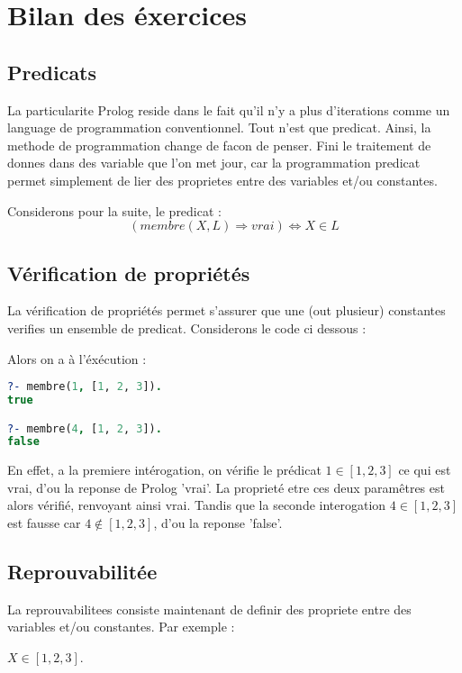 
\chapter{Bilan des éxercices}

\section{Predicats}

La particularite Prolog reside dans le fait qu'il n'y a plus d'iterations comme
un language de programmation conventionnel. Tout n'est que predicat. Ainsi, la
methode de programmation change de facon de penser. Fini le traitement de donnes
dans des variable que l'on met jour, car la programmation predicat permet
simplement de lier des proprietes entre des variables et/ou constantes.

Considerons pour la suite, le predicat :
\[(membre(X, L) \Rightarrow vrai) \Leftrightarrow X \in L\]


\section{Vérification de propriétés}

La vérification de propriétés permet s'assurer que une (out plusieur) constantes
verifies un ensemble de predicat. Considerons le code ci dessous :

Alors on a à l'éxécution :

\begin{lstlisting}[language=Prolog]
?- membre(1, [1, 2, 3]).
true

?- membre(4, [1, 2, 3]).
false
\end{lstlisting}

En effet, a la premiere intérogation, on vérifie le prédicat $1 \in [1, 2, 3]$
ce qui est vrai, d'ou la reponse de Prolog 'vrai'. La proprieté etre ces deux
paramêtres est alors vérifié, renvoyant ainsi vrai. Tandis que la seconde
interogation $4 \in [1, 2, 3]$ est fausse car $4 \notin [1, 2, 3]$, d'ou la
reponse 'false'.


\section{Reprouvabilitée}

La reprouvabilitees consiste maintenant de definir des propriete entre des
variables et/ou constantes. Par exemple :
\begin{center}
$X \in [1, 2, 3]$.
\end{center}

